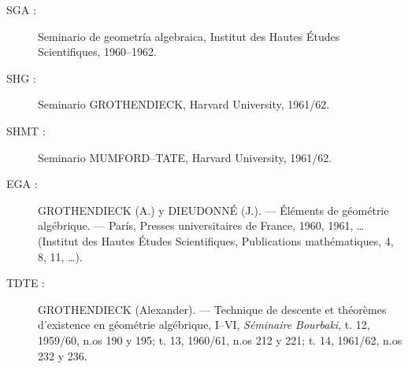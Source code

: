 \documentclass[11pt,twoside,openany]{book}
\numberwithin{equation}{section}
\newcommand{\src}[1]{%
  \phantomsection\hypertarget{src:#1}{}%
  \marginpar{\raggedleft\footnotesize\sffamily #1}%
}
\theoremstyle{plain}
\theoremstyle{definition}
\theoremstyle{remark}
\newcommand{\FgaUnitKey}{frontmatter}
\renewcommand{\src}[1]{%
  \phantomsection\hypertarget{src:\FgaUnitKey:#1}{}%
  \marginpar{\raggedleft\footnotesize\sffamily #1}%
}
\theoremstyle{plain}
\theoremstyle{definition}
\theoremstyle{remark}
\begin{document}
\begin{description}
\item[SGA :] Seminario de geometría algebraica, Institut des Hautes Études
Scientifiques, 1960--1962.

\src{298}
\item[SHG :] Seminario GROTHENDIECK, Harvard University, 1961/62.

\item[SHMT :] Seminario MUMFORD--TATE, Harvard University, 1961/62.

\item[EGA :] GROTHENDIECK (A.) y DIEUDONNÉ (J.). --- Éléments de géométrie
algébrique. --- París, Presses universitaires de France, 1960, 1961, …
(Institut des Hautes Études Scientifiques, Publications mathématiques, 4, 8,
11, …).

\item[TDTE :] GROTHENDIECK (Alexander). --- Technique de descente et théorèmes
d'existence en géométrie algébrique, I--VI, \emph{Séminaire Bourbaki}, t. 12,
1959/60, n.os 190 y 195; t. 13, 1960/61, n.os 212 y 221; t. 14, 1961/62,
n.os 232 y 236.
\end{description}
\end{document}
